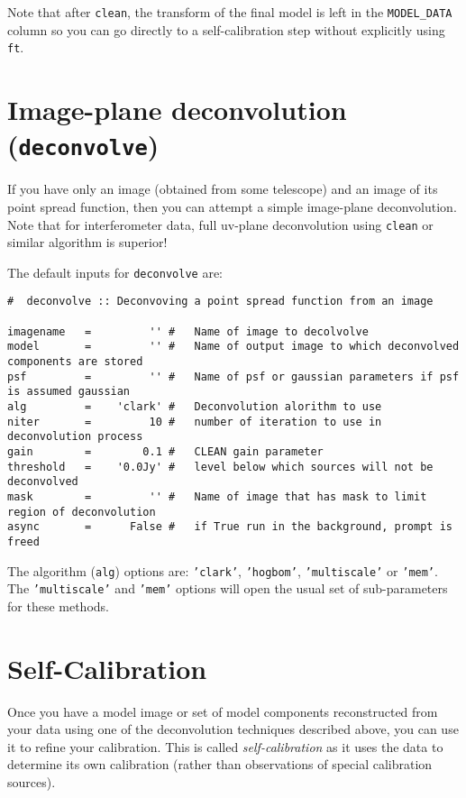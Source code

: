 Note that after {\tt clean}, the transform of the final model is
left in the {\tt MODEL\_DATA} column so you can go directly to
a self-calibration step without explicitly using {\tt ft}.

\section{Image-plane deconvolution ({\tt deconvolve})}
\label{section:im.deconvolve}

If you have only an image (obtained from some telescope) and an image
of its point spread function, then you can attempt a simple image-plane
deconvolution.  Note that for interferometer data, full uv-plane 
deconvolution using {\tt clean} or similar algorithm is superior!

The default inputs for {\tt deconvolve} are:
\small
\begin{verbatim}
#  deconvolve :: Deconvoving a point spread function from an image

imagename   =         '' #   Name of image to decolvolve
model       =         '' #   Name of output image to which deconvolved components are stored
psf         =         '' #   Name of psf or gaussian parameters if psf is assumed gaussian
alg         =    'clark' #   Deconvolution alorithm to use
niter       =         10 #   number of iteration to use in deconvolution process
gain        =        0.1 #   CLEAN gain parameter 
threshold   =    '0.0Jy' #   level below which sources will not be deconvolved
mask        =         '' #   Name of image that has mask to limit region of deconvolution
async       =      False #   if True run in the background, prompt is freed

\end{verbatim}
\normalsize

The algorithm ({\tt alg}) options are: {\tt 'clark'}, {\tt 'hogbom'}, 
{\tt 'multiscale'} or {\tt 'mem'}.  The {\tt 'multiscale'} and
{\tt 'mem'} options will open the usual set of sub-parameters for these
methods.

\section{Self-Calibration}
\label{section:im.selfcal}

Once you have a model image or set of model components reconstructed
from your data using one of the deconvolution techniques described
above, you can use it to refine your calibration.  This is called
{\it self-calibration} as it uses the data to determine its own
calibration (rather than observations of special calibration sources).


